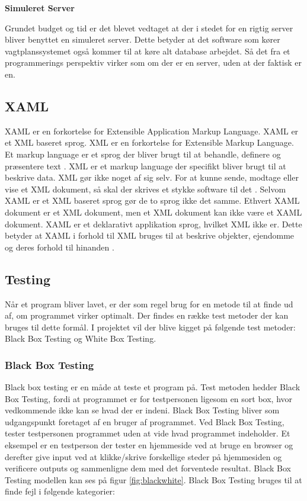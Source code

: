 \noindent\textbf{Simuleret Server}

Grundet budget og tid er det blevet vedtaget at der i stedet for en rigtig server bliver benyttet en simuleret server. Dette betyder at det software som kører vagtplanssystemet også kommer til at køre alt database arbejdet. Så det fra et programmerings perspektiv virker som om der er en server, uden at der faktisk er en.

\subsection{XAML}

XAML er en forkortelse for Extensible Application Markup Language. XAML er et XML baseret sprog. XML er en forkortelse for Extensible Markup Language. Et markup language er et sprog der bliver brugt til at behandle, definere og præsentere text \citep{Beal2015}. XML er et markup language der specifikt bliver brugt til at beskrive data. XML gør ikke noget af sig selv. For at kunne sende, modtage eller vise et XML dokument, så skal der skrives et stykke software til det \citep{W3C2015}. Selvom XAML er et XML baseret sprog gør de to sprog ikke det samme. Ethvert XAML dokument er et XML dokument, men et XML dokument kan ikke være et XAML dokument. XAML er et deklarativt applikation sprog, hvilket XML ikke er. Dette betyder at XAML i forhold til XML bruges til at beskrive objekter, ejendomme og deres forhold til hinanden \citep{T2009}.

\subsection{Testing}

Når et program bliver lavet, er der som regel brug for en metode til at finde ud af, om programmet virker optimalt. Der findes en række test metoder der kan bruges til dette formål. I projektet vil der blive kigget på følgende test metoder: Black Box Testing og White Box Testing.

\subsubsection{Black Box Testing}
Black box testing er en måde at teste et program på. Test metoden hedder Black Box Testing, fordi at programmet er for testpersonen ligesom en sort box, hvor vedkommende ikke kan se hvad der er indeni. Black Box Testing bliver som udgangspunkt foretaget af en bruger af programmet. Ved Black Box Testing, tester testpersonen programmet uden at vide hvad programmet indeholder. Et eksempel er en testperson der tester en hjemmeside ved at bruge en browser og derefter give input ved at klikke/skrive forskellige steder på hjemmesiden og verificere outputs og sammenligne dem med det forventede resultat. Black Box Testing modellen kan ses på figur \ref{fig:blackwhite}. Black Box Testing bruges til at finde fejl i følgende kategorier:\\


